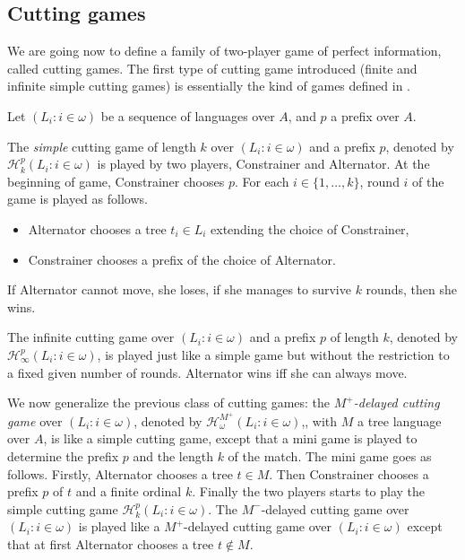 
\subsection{Cutting games}

\label{cuttinggames}
We are going now to define a family of two-player game of perfect information, called cutting games. 
The first type of cutting game  introduced (finite and infinite simple cutting games) is essentially the kind of games defined in \cite{bp}.

Let $( L_i : i \in \omega )$ be a sequence of languages over $A$, and $p$ a prefix over $A$. 

The \emph{simple} cutting game of length $k$ over $( L_i : i \in \omega )$ and a prefix $p$, denoted by $\mathcal{H}^p_k(L_i : i \in \omega )$ is played by two players, Constrainer and Alternator.
At the beginning of game, Constrainer chooses $p$.
For each $i \in \{1, \dots, k \}$, round $i$ of the game is played as follows.
\begin{itemize}
\item Alternator chooses a tree $t_i \in L_i$ extending the choice of Constrainer, 
\item Constrainer chooses a prefix of the choice of Alternator.
\end{itemize}
If Alternator cannot move, she loses, if she manages to survive $k$ rounds, then she wins.

The infinite cutting game over $( L_i : i \in \omega )$ and a prefix $p$ of length $k$, denoted by $\mathcal{H}^p_\infty(L_i : i \in \omega )$, is played just like a simple game but without the restriction to a fixed given number of rounds. Alternator wins iff she can always move.

We now generalize the previous class of cutting games: the \emph{$M^+$-delayed cutting game} over $( L_i : i \in \omega )$, denoted by $\mathcal{H}^{M^+}_\omega(L_i : i \in \omega )$,, with $M$ a tree language over $A$, is like a simple cutting game, except that a mini game is played to determine the prefix $p$ and the length $k$ of the match. 
The mini game goes as follows. Firstly, Alternator chooses a tree $t \in M$. Then Constrainer chooses a prefix $p$ of $t$ and a finite ordinal $k$. Finally the two players starts to play the simple cutting game $\mathcal{H}^p_k(L_i : i \in \omega )$. 
The $M^-$-delayed cutting game over $( L_i : i \in \omega )$ is played like a $M^+$-delayed cutting game over $( L_i : i \in \omega )$ except that at first Alternator chooses a tree $t \notin M$.

